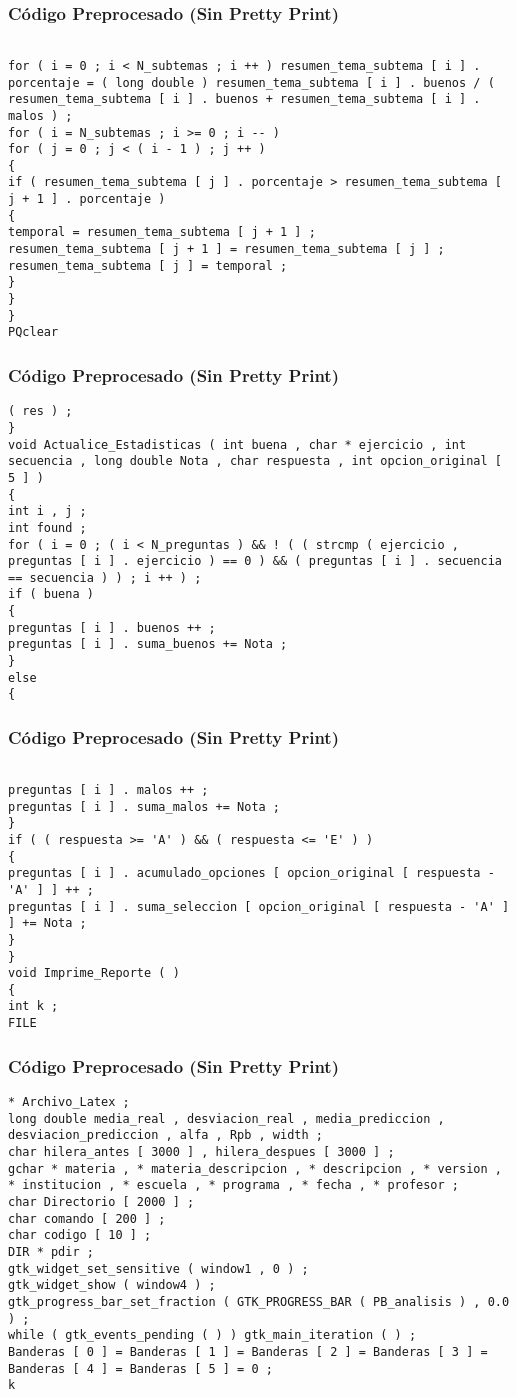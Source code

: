 \documentclass{beamer}
\begin{document}
\begin{frame}[fragile]
\frametitle{C\'odigo Preprocesado (Sin Pretty Print)}
\begin{lstlisting}[style=CStyle]

for ( i = 0 ; i < N_subtemas ; i ++ ) resumen_tema_subtema [ i ] . porcentaje = ( long double ) resumen_tema_subtema [ i ] . buenos / ( resumen_tema_subtema [ i ] . buenos + resumen_tema_subtema [ i ] . malos ) ; 
for ( i = N_subtemas ; i >= 0 ; i -- ) 
for ( j = 0 ; j < ( i - 1 ) ; j ++ ) 
{ 
if ( resumen_tema_subtema [ j ] . porcentaje > resumen_tema_subtema [ j + 1 ] . porcentaje ) 
{ 
temporal = resumen_tema_subtema [ j + 1 ] ; 
resumen_tema_subtema [ j + 1 ] = resumen_tema_subtema [ j ] ; 
resumen_tema_subtema [ j ] = temporal ; 
} 
} 
} 
PQclear \end{lstlisting}
\end{frame}
\begin{frame}[fragile]
\frametitle{C\'odigo Preprocesado (Sin Pretty Print)}
\begin{lstlisting}[style=CStyle]
( res ) ; 
} 
void Actualice_Estadisticas ( int buena , char * ejercicio , int secuencia , long double Nota , char respuesta , int opcion_original [ 5 ] ) 
{ 
int i , j ; 
int found ; 
for ( i = 0 ; ( i < N_preguntas ) && ! ( ( strcmp ( ejercicio , preguntas [ i ] . ejercicio ) == 0 ) && ( preguntas [ i ] . secuencia == secuencia ) ) ; i ++ ) ; 
if ( buena ) 
{ 
preguntas [ i ] . buenos ++ ; 
preguntas [ i ] . suma_buenos += Nota ; 
} 
else 
{ \end{lstlisting}
\end{frame}
\begin{frame}[fragile]
\frametitle{C\'odigo Preprocesado (Sin Pretty Print)}
\begin{lstlisting}[style=CStyle]

preguntas [ i ] . malos ++ ; 
preguntas [ i ] . suma_malos += Nota ; 
} 
if ( ( respuesta >= 'A' ) && ( respuesta <= 'E' ) ) 
{ 
preguntas [ i ] . acumulado_opciones [ opcion_original [ respuesta - 'A' ] ] ++ ; 
preguntas [ i ] . suma_seleccion [ opcion_original [ respuesta - 'A' ] ] += Nota ; 
} 
} 
void Imprime_Reporte ( ) 
{ 
int k ; 
FILE \end{lstlisting}
\end{frame}
\begin{frame}[fragile]
\frametitle{C\'odigo Preprocesado (Sin Pretty Print)}
\begin{lstlisting}[style=CStyle]
* Archivo_Latex ; 
long double media_real , desviacion_real , media_prediccion , desviacion_prediccion , alfa , Rpb , width ; 
char hilera_antes [ 3000 ] , hilera_despues [ 3000 ] ; 
gchar * materia , * materia_descripcion , * descripcion , * version , * institucion , * escuela , * programa , * fecha , * profesor ; 
char Directorio [ 2000 ] ; 
char comando [ 200 ] ; 
char codigo [ 10 ] ; 
DIR * pdir ; 
gtk_widget_set_sensitive ( window1 , 0 ) ; 
gtk_widget_show ( window4 ) ; 
gtk_progress_bar_set_fraction ( GTK_PROGRESS_BAR ( PB_analisis ) , 0.0 ) ; 
while ( gtk_events_pending ( ) ) gtk_main_iteration ( ) ; 
Banderas [ 0 ] = Banderas [ 1 ] = Banderas [ 2 ] = Banderas [ 3 ] = Banderas [ 4 ] = Banderas [ 5 ] = 0 ; 
k \end{lstlisting}
\end{frame}
\end{document}
